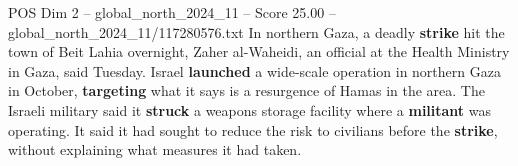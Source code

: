 \begin{textsample}{POS Dim 2 – global\_north\_2024\_11 – Score 25.00 – global\_north\_2024\_11/117280576.txt}
In northern Gaza, a deadly \textbf{strike} hit the town of Beit Lahia overnight, Zaher al-Waheidi, an official at the Health Ministry in Gaza, said Tuesday.
Israel \textbf{launched} a wide-scale operation in northern Gaza in October, \textbf{targeting} what it says is a resurgence of Hamas in the area.
The Israeli military said it \textbf{struck} a weapons storage facility where a \textbf{militant} was operating.
It said it had sought to reduce the risk to civilians before the \textbf{strike}, without explaining what measures it had taken.

\end{textsample}
